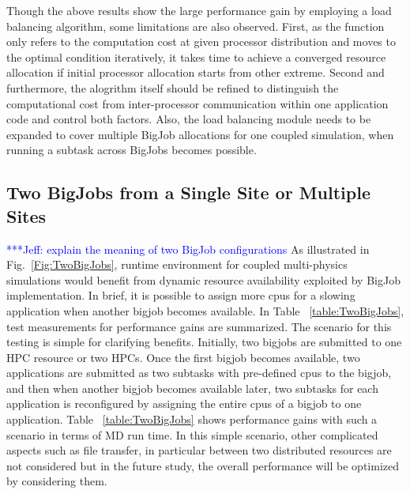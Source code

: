 \documentclass[conference,final]{IEEEtran}
\newcommand{\skonote}[1]{ {\textcolor{blue} { ***Jeff: #1 }}}
\newcommand{\skonote}[1]{}
\begin{document}
Though the above results show the large performance gain by employing a load balancing algorithm, some limitations are also observed. First, as the function only refers to the computation cost at given processor distribution and moves to the optimal condition iteratively, it takes time to achieve a converged resource allocation if initial processor allocation starts from other extreme. Second and furthermore, the alogrithm itself should be refined to distinguish the computational cost from inter-processor communication within one application code and control both factors. Also, the load balancing module needs to be expanded to cover multiple BigJob allocations for one coupled simulation, when running a subtask across BigJobs becomes possible.


\subsection{Two BigJobs from a Single Site or Multiple Sites}

\skonote{explain the meaning of two BigJob configurations}
As illustrated in Fig.~\ref{Fig:TwoBigJobs}, runtime environment for coupled multi-physics simulations would benefit from dynamic resource availability exploited by BigJob implementation.  In brief, it is possible to assign more cpus for a slowing application when another bigjob becomes available. In Table ~\ref{table:TwoBigJobs}, test measurements for performance gains are summarized. The scenario for this testing is simple for clarifying benefits.  Initially, two bigjobs are submitted to one HPC resource or two HPCs.  Once the first bigjob becomes available, two applications are submitted as two subtasks with pre-defined cpus to the bigjob, and then when another bigjob becomes available later, two subtasks for each application is reconfigured by assigning the entire cpus of a bigjob to one application.  Table  ~\ref{table:TwoBigJobs} shows performance gains with such a scenario in terms of MD run time.  In this simple scenario, other complicated aspects such as file transfer, in particular between two distributed resources are not considered but in the future study, the overall performance will be optimized by considering them.
\end{document}
